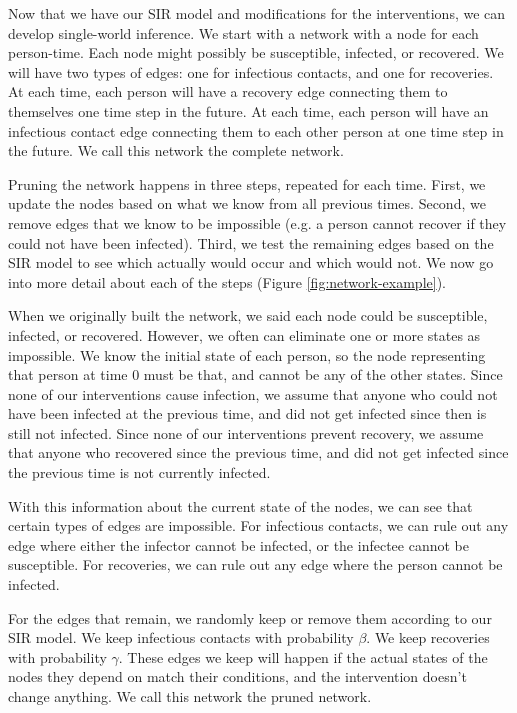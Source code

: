 \documentclass[openacc]{rsproca_new}%
\begin{document}
Now that we have our SIR model and modifications for the interventions, we can develop single-world inference.
We start with a network with a node for each person-time.
Each node might possibly be susceptible, infected, or recovered.
We will have two types of edges: one for infectious contacts, and one for recoveries.
At each time, each person will have a recovery edge connecting them to themselves one time step in the future.
At each time, each person will have an infectious contact edge connecting them to each other person at one time step in the future.
We call this network the complete network.

Pruning the network happens in three steps, repeated for each time.
First, we update the nodes based on what we know from all previous times.
Second, we remove edges that we know to be impossible (e.g. a person cannot recover if they could not have been infected).
Third, we test the remaining edges based on the SIR model to see which actually would occur and which would not.
We now go into more detail about each of the steps (Figure \ref{fig:network-example}).

When we originally built the network, we said each node could be susceptible, infected, or recovered.
However, we often can eliminate one or more states as impossible.
We know the initial state of each person, so the node representing that person at time $0$ must be that, and cannot be any of the other states.
Since none of our interventions cause infection, we assume that anyone who could not have been infected at the previous time, and did not get infected since then is still not infected.
Since none of our interventions prevent recovery, we assume that anyone who recovered since the previous time, and did not get infected since the previous time is not currently infected.

With this information about the current state of the nodes, we can see that certain types of edges are impossible.
For infectious contacts, we can rule out any edge where either the infector cannot be infected, or the infectee cannot be susceptible.
For recoveries, we can rule out any edge where the person cannot be infected.

For the edges that remain, we randomly keep or remove them according to our SIR model.
We keep infectious contacts with probability $\beta$.
We keep recoveries with probability $\gamma$.
These edges we keep will happen if the actual states of the nodes they depend on match their conditions, and the intervention doesn't change anything.
We call this network the pruned network.
\end{document}
